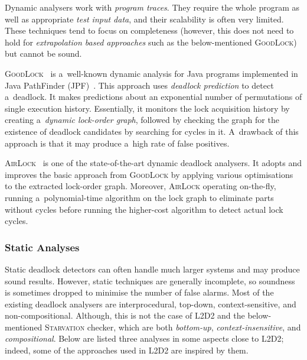 \documentclass[runningheads]{llncs}
\newcommand{\LLDD}{\textsc{L2D2}\xspace} %
\begin{document}
Dynamic analysers work with \emph{program traces}. They require the whole
program as well as appropriate \emph{test input data}, and their scalability
is often very limited. These techniques tend to focus on completeness
(however, this does not need to hold for \emph{extrapolation based approaches}
such as the below-mentioned \textsc{GoodLock}) but cannot be sound.

\textsc{GoodLock}~\cite{goodlock00} is a~well-known dynamic analysis for
Java programs implemented in Java PathFinder (JPF)~\cite{jpf00}. This
approach uses \emph{deadlock prediction} to detect a~deadlock. It makes
predictions about an exponential number of permutations of single
execution history. Essentially, it monitors the lock acquisition history
by creating a~\emph{dynamic lock-order graph}, followed by checking the
graph for the existence of deadlock candidates by searching for cycles
in it. A~drawback of this approach is that it may produce a~high rate
of false positives.

\textsc{AirLock}~\cite{airlock20} is one of the state-of-the-art dynamic
deadlock analysers. It adopts and improves the basic approach from
\textsc{GoodLock} by applying various optimisations to the extracted
lock-order graph. Moreover, \textsc{AirLock} operating on-the-fly,
running a~polynomial-time algorithm on the lock graph to eliminate parts
without cycles before running the higher-cost algorithm to detect
actual lock cycles.

\vspace*{-4mm}\subsubsection{Static Analyses}

Static deadlock detectors can often handle much larger systems and may produce
sound results. However, static techniques are generally incomplete, so soundness
is sometimes dropped to minimise the number of false alarms.  Most of the
existing deadlock analysers are interprocedural, top-down, context-sensitive,
and non-compositional. Although, this is not the case of \LLDD and the
below-mentioned \textsc{Starvation} checker, which are both \emph{bottom-up},
\emph{context-insensitive}, and \emph{compositional}. Below are listed three
analyses in some aspects close to \LLDD; indeed, some of the approaches used in
\LLDD are inspired by them.
\end{document}
